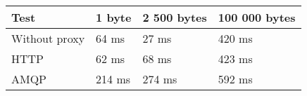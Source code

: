 \begin{tabularx}{\textwidth}{llll}
\hline
 Test          & 1 byte   & 2 500 bytes   & 100 000 bytes   \\
\hline
 Without proxy & 64 ms    & 27 ms         & 420 ms          \\
 HTTP          & 62 ms    & 68 ms         & 423 ms          \\
 AMQP          & 214 ms   & 274 ms        & 592 ms          \\
\hline
\end{tabularx}